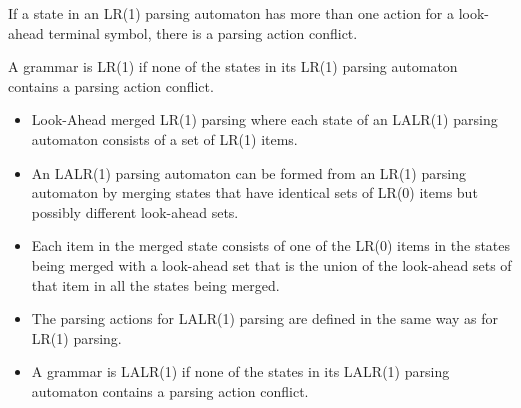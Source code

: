 If a state in an LR(1) parsing automaton has more than one action for a look-ahead 
terminal symbol, there is a parsing action conflict.

A grammar is LR(1) if none of the states in its LR(1) parsing automaton contains a parsing
action conflict.


\begin{itemize}
    \item Look-Ahead merged LR(1) parsing where each state of an LALR(1) parsing automaton 
    consists of a set of LR(1) items.
    \item An LALR(1) parsing automaton can be formed from an LR(1) parsing automaton by 
    merging states that have identical sets of LR(0) items but possibly different look-ahead 
    sets.
    \item Each item in the merged state consists of one of the LR(0) items in the states 
    being merged with a look-ahead set that is the union of the look-ahead sets of that item 
    in all the states being merged.
    \item The parsing actions for LALR(1) parsing are defined in the same way as for LR(1) 
    parsing.
    \item A grammar is LALR(1) if none of the states in its LALR(1) parsing automaton contains 
    a parsing action conflict.
\end{itemize}